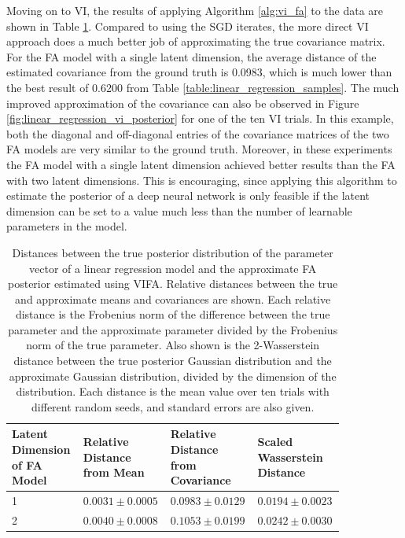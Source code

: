\documentclass[msc,deptreport.inf]{infthesis} %
\begin{document}
Moving on to VI, the results of applying Algorithm \ref{alg:vi_fa} to the data are shown in Table \ref{table:linear_regression_vi_posterior}. Compared to using the SGD iterates, the more direct VI approach does a much better job of approximating the true covariance matrix. For the FA model with a single latent dimension, the average distance of the estimated covariance from the ground truth is 0.0983, which is much lower than the best result of 0.6200 from Table \ref{table:linear_regression_samples}. The much improved approximation of the covariance can also be observed in Figure \ref{fig:linear_regression_vi_posterior} for one of the ten VI trials. In this example, both the diagonal and off-diagonal entries of the covariance matrices of the two FA models are very similar to the ground truth. Moreover, in these experiments the FA model with a single latent dimension achieved better results than the FA with two latent dimensions. This is encouraging, since applying this algorithm to estimate the posterior of a deep neural network is only feasible if the latent dimension can be set to a value much less than the number of learnable parameters in the model. 

\begin{table}[h!]
	\begin{center}
		\begin{tabular}{|| p{0.21\linewidth} p{0.21\linewidth} p{0.21\linewidth} p{0.21\linewidth} ||} 
 			\hline
 			Latent Dimension of FA Model & Relative Distance from Mean & Relative Distance from Covariance & Scaled Wasserstein Distance \\ [0.5ex] 
 			\hline\hline
			1 	& $0.0031 \pm 0.0005$ 	& $0.0983 \pm 0.0129$ 	& $0.0194 \pm 0.0023$ \\ [1ex] 
			\hline
 			2 	& $0.0040 \pm 0.0008$ 	& $ 0.1053 \pm 0.0199$ 	& $0.0242 \pm 0.0030$ \\ [1ex] 
			\hline
		\end{tabular}
		\caption{Distances between the true posterior distribution of the parameter vector of a linear regression model and the approximate FA posterior estimated using VIFA. Relative distances between the true and approximate means and covariances are shown. Each relative distance is the Frobenius norm of the difference between the true parameter and the approximate parameter divided by the Frobenius norm of the true parameter. Also shown is the 2-Wasserstein distance between the true posterior Gaussian distribution and the approximate Gaussian distribution, divided by the dimension of the distribution. Each distance is the mean value over ten trials with different random seeds, and standard errors are also given.}
		\label{table:linear_regression_vi_posterior}
	\end{center}
\end{table}
\end{document}
